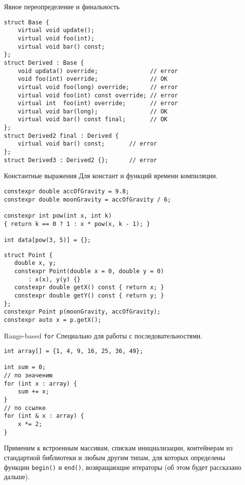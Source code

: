 \documentclass{beamer}
\begin{document}
\begin{frame}[fragile]{Явное переопределение и финальность}
    \begin{lstlisting}
struct Base {
    virtual void update();
    virtual void foo(int);
    virtual void bar() const;
};
struct Derived : Base {
    void updata() override;          	  // error
    void foo(int) override;               // OK
    virtual void foo(long) override;      // error
    virtual void foo(int) const override; // error
    virtual int  foo(int) override;       // error
    virtual void bar(long);               // OK
    virtual void bar() const final;       // OK
};
struct Derived2 final : Derived {
    virtual void bar() const;       // error
};
struct Derived3 : Derived2 {};      // error
    \end{lstlisting}
\end{frame}



\begin{frame}[fragile]{Константные выражения}
Для констант и функций времени компиляции.
\begin{lstlisting}
constexpr double accOfGravity = 9.8;
constexpr double moonGravity = accOfGravity / 6;

constexpr int pow(int x, int k) 
{ return k == 0 ? 1 : x * pow(x, k - 1); }

int data[pow(3, 5)] = {};
\end{lstlisting}

\begin{lstlisting}
struct Point {
   double x, y;
   constexpr Point(double x = 0, double y = 0)
       : x(x), y(y) {}
   constexpr double getX() const { return x; }
   constexpr double getY() const { return y; }
};
constexpr Point p(moonGravity, accOfGravity);
constexpr auto x = p.getX();
\end{lstlisting}
\end{frame}

\begin{frame}[fragile]{Range-based {\tt for}}
Специально для работы с последовательностями.
\begin{lstlisting}
int array[] = {1, 4, 9, 16, 25, 36, 49};

int sum = 0;
// по значению
for (int x : array) {
    sum += x;
}
// по ссылке
for (int & x : array) {
    x *= 2;
}
\end{lstlisting}

Применим к встроенным массивам, спискам инициализации, контейнерам из стандартной библиотеки и любым другим типам, для которых определены функции \texttt{begin()} и \texttt{end()}, возвращающие итераторы  (об этом будет рассказано дальше).      
\end{frame}
\end{document}

